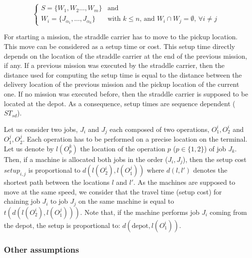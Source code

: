 \documentclass[a4paper,10pt]{article}
\begin{document}
\begin{equation*}
\begin{cases}
 S = \{ W_{1} , W_{2} \ldots , W_{m}\} & \text{and}\\
 W_{i} = \{ J_{\alpha_1} , \ldots , J_{\alpha_k} \} & \text{with $k \leq n$, and $W_{i} \cap W_{j} = \emptyset$,  $\forall i \neq j$} 
\end{cases}
\end{equation*}
 

For starting a mission, the straddle carrier has to move to the pickup location. This move can be considered as a setup time or cost. This setup time directly depends on the location of the straddle carrier at the end of the previous mission, if any. If a previous mission was executed by the straddle carrier, then the distance used for computing the setup time is equal to the distance between the delivery location of the previous mission and the pickup location of the current one. If no mission was executed before, then the straddle carrier is supposed to be located at the depot. As a consequence, setup times are sequence dependent ($ST_{sd}$). 

Let us consider two jobs, $J_i$ and $J_j$ each composed of two operations, $O^i_1, O^i_2$ and $O^j_1, O^j_2$. Each operation has to be performed on a precise location on the terminal. Let us denote by $l(O^k_p)$ the location of the operation $p$ ($p \in \{1,2\}$) of job $J_k$. Then, if a machine is allocated both jobs in the order ($J_i, J_j$), then the setup cost $setup_{i,j}$ is proportional to $d(l(O^i_2),l(O^j_1))$ where $d(l,l')$ denotes the shortest path between the locations $l$ and $l'$. As the machines are supposed to move at the same speed, we consider that the travel time (setup cost) for chaining job $J_i$ to job $J_j$ on the same machine is equal to $t(d(l(O^i_2),l(O^j_1)))$. Note that, if the machine performs job $J_i$ coming from the depot, the setup is proportional to: $d(\mbox{depot},l(O^i_1))$.

\subsubsection{Other assumptions}
\end{document}
